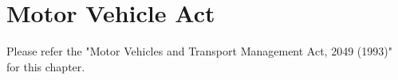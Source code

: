 \chapter{Motor Vehicle Act}
Please refer the "Motor Vehicles and Transport Management Act, 2049 (1993)" for this chapter.